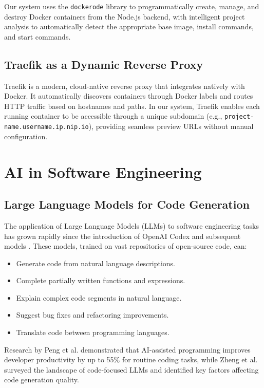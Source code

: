 \documentclass[12pt,a4paper,oneside]{report}
\begin{document}
Our system uses the \texttt{dockerode} library to programmatically create, manage, and destroy Docker containers from the Node.js backend, with intelligent project analysis to automatically detect the appropriate base image, install commands, and start commands.

\subsection{Traefik as a Dynamic Reverse Proxy}

Traefik is a modern, cloud-native reverse proxy that integrates natively with Docker. It automatically discovers containers through Docker labels and routes HTTP traffic based on hostnames and paths. In our system, Traefik enables each running container to be accessible through a unique subdomain (e.g., \texttt{project-name.username.ip.nip.io}), providing seamless preview URLs without manual configuration.

\section{AI in Software Engineering}

\subsection{Large Language Models for Code Generation}

The application of Large Language Models (LLMs) to software engineering tasks has grown rapidly since the introduction of OpenAI Codex and subsequent models \cite{peng2023, zheng2023}. These models, trained on vast repositories of open-source code, can:

\begin{itemize}
    \item Generate code from natural language descriptions.
    \item Complete partially written functions and expressions.
    \item Explain complex code segments in natural language.
    \item Suggest bug fixes and refactoring improvements.
    \item Translate code between programming languages.
\end{itemize}

Research by Peng et al. \cite{peng2023} demonstrated that AI-assisted programming improves developer productivity by up to 55\% for routine coding tasks, while Zheng et al. \cite{zheng2023} surveyed the landscape of code-focused LLMs and identified key factors affecting code generation quality.
\end{document}
